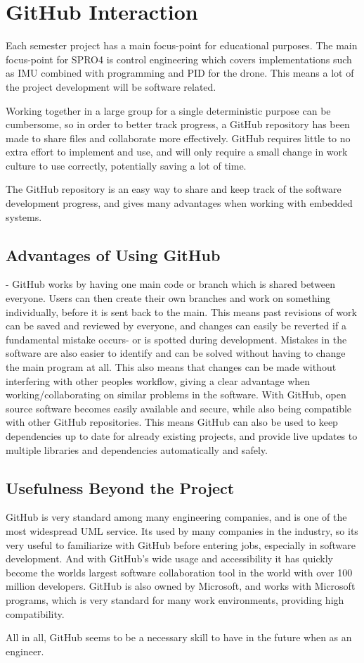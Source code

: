 


\section{GitHub Interaction}
Each semester project has a main focus-point for educational purposes. The main focus-point for SPRO4 is control engineering which covers implementations such as IMU combined with programming and PID for the drone. This means a lot of the project development will be software related.

Working together in a large group for a single deterministic purpose can be cumbersome, so in order to better track progress, a GitHub repository has been made to share files and collaborate more effectively. GitHub requires little to no extra effort to implement and use, and will only require a small change in work culture to use correctly, potentially saving a lot of time.

 The GitHub repository is an easy way to share and keep track of the software development progress, and gives many advantages when working with embedded systems. 

\subsection{Advantages of Using GitHub}
- GitHub works by having one main code or branch which is shared between everyone. Users can then create their own branches and work on something individually, before it is sent back to the main. This means past revisions of work can be saved and reviewed by everyone, and changes can easily be reverted if a fundamental mistake occurs- or is spotted during development. Mistakes in the software are also easier to identify and can be solved without having to change the main program at all. This also means that changes can be made without interfering with other peoples workflow, giving a clear advantage when working/collaborating on similar problems in the software.\cite{benefitsGithub}
With GitHub, open source software becomes easily available and secure, while also being compatible with other GitHub repositories. This means GitHub can also be used to keep dependencies up to date for already existing projects, and provide live updates to multiple libraries and dependencies automatically and safely. \cite{githubaccelerates}

\subsection{Usefulness Beyond the Project}
GitHub is very standard among many engineering companies, and is one of the most widespread UML service. Its used by many companies in the industry, so its very useful to familiarize with GitHub before entering jobs, especially in software development.
 And with GitHub's wide usage and accessibility it has quickly become the worlds largest software collaboration tool in the world with over 100 million developers.\cite{WhoGithub} GitHub is also owned by Microsoft, and works with Microsoft programs, which is very standard for many work environments, providing high  compatibility.

All in all, GitHub seems to be a necessary skill to have in the future when as an engineer.

